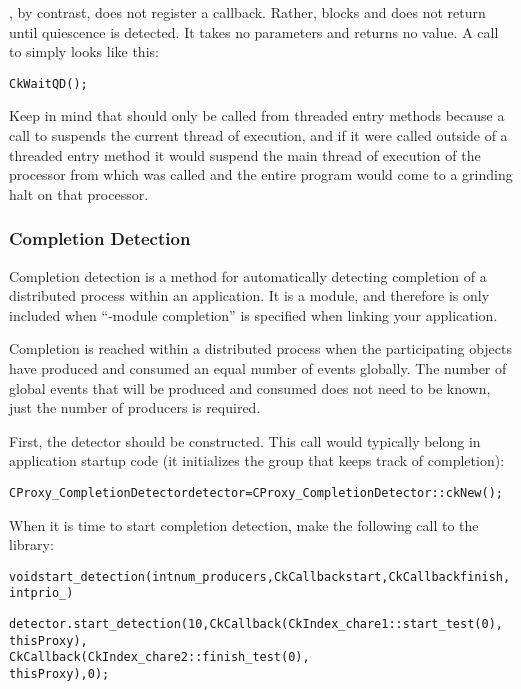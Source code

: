 , by contrast, does not register a callback.  Rather,
 blocks and does not return until quiescence is
detected.  It takes no parameters and returns no value.  A call to
 simply looks like this: 

\begin{alltt}
  CkWaitQD();
\end{alltt}

Keep in mind that  should only be called from threaded
entry methods because a call to  suspends the
current thread of execution, and if it were called outside of a threaded entry
method it would suspend the main thread of execution of the processor from
which  was called and the entire program would come to a grinding
halt on that processor.

\subsubsection{Completion Detection}

Completion detection is a method for automatically detecting
completion of a distributed process within an application. It is a
module, and therefore is only included when ``-module completion'' is
specified when linking your application.

Completion is reached within a distributed process when the
participating objects have produced and consumed an equal number of
events globally. The number of global events that will be produced and
consumed does not need to be known, just the number of producers is
required.

First, the detector should be constructed. This call would typically
belong in application startup code (it initializes the group that
keeps track of completion):

\begin{alltt}
CProxy_CompletionDetector detector = CProxy_CompletionDetector::ckNew();
\end{alltt}

When it is time to start completion detection, make the following call to the
library:

\begin{alltt}
void start_detection(int num_producers, CkCallback start, CkCallback finish,
int prio_)
\end{alltt}

\begin{alltt}
detector.start_detection(10, CkCallback(CkIndex_chare1::start_test(0),
                                       thisProxy),
                             CkCallback(CkIndex_chare2::finish_test(0),
                                       thisProxy), 0);
\end{alltt}


